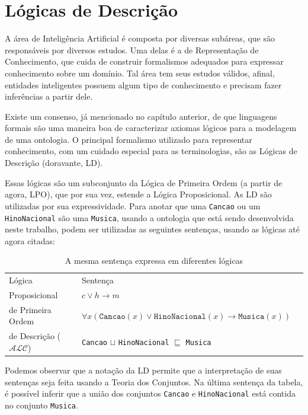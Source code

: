 \chapter{Lógicas de Descrição}

\lettrine{A}{} área de Inteligência Artificial é composta por diversas subáreas, que são responsáveis por diversos estudos. Uma delas é a de Representação de Conhecimento, que cuida de construir formalismos adequados para expressar conhecimento sobre um domínio. Tal área tem seus estudos válidos, afinal, entidades inteligentes possuem algum tipo de conhecimento e precisam fazer inferências a partir dele.

Existe um consenso, já mencionado no capítulo anterior, de que linguagens formais são uma maneira boa de caracterizar axiomas lógicos para a modelagem de uma ontologia. O principal formalismo utilizado para representar conhecimento, com um cuidado especial para as terminologias, são as Lógicas de Descrição (doravante, LD).

Essas lógicas são um subconjunto da Lógica de Primeira Ordem (a partir de agora, LPO), que por sua vez, estende a Lógica Proposicional. As LD são utilizadas por sua expressividade. Para anotar que uma \texttt{Cancao} ou um \texttt{HinoNacional} são uma \texttt{Musica}, usando a ontologia que está sendo desenvolvida neste trabalho, podem ser utilizadas as seguintes sentenças, usando as lógicas até agora citadas:

\begin{table}[H]
	\centering
	\begin{tabular}{|l|l|l}
		\cline{1-2}
		Lógica                           & Sentença                                                                             & \\ \cline{1-2}
		Proposicional                    & $c \lor h \to m$                                                                     & \\ \cline{1-2}
		de Primeira Ordem                & $\forall x(\texttt{Cancao}(x) \lor \texttt{HinoNacional}(x) \to \texttt{Musica}(x))$ & \\ \cline{1-2}
		de Descrição ($ \mathcal{ALC} $) & \texttt{Cancao} $\sqcup$ \texttt{HinoNacional} $\sqsubseteq$ \texttt{Musica}         & \\ \cline{1-2}
	\end{tabular}
\caption{A mesma sentença expressa em diferentes lógicas}
\end{table}

Podemos observar que a notação da LD permite que a interpretação de suas sentenças seja feita usando a Teoria dos Conjuntos. Na última sentença da tabela, é possível inferir que a união dos conjuntos \texttt{Cancao} e \texttt{HinoNacional} está contida no conjunto \texttt{Musica}.

